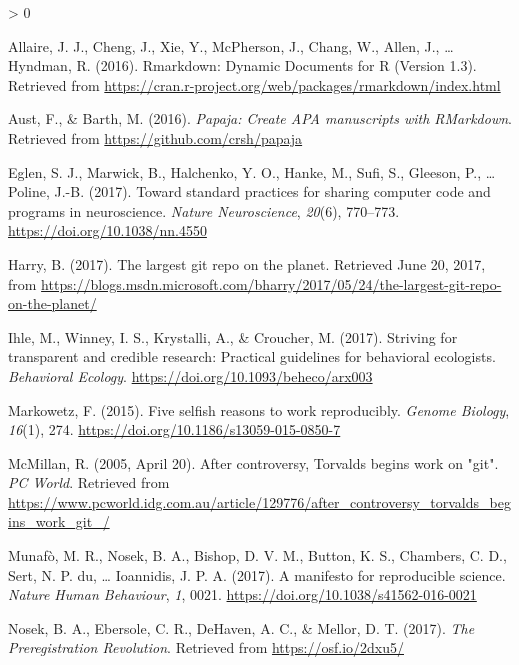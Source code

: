 \documentclass[
  american,
  ,doc,floatsintext]{apa6}
\newlength{\cslhangindent}
\newenvironment{CSLReferences}[2] %
 {%
  \setlength{\parindent}{0pt}
  \ifodd #1 \everypar{\setlength{\hangindent}{\cslhangindent}}\ignorespaces\fi
  \ifnum #2 > 0
  \setlength{\parskip}{#2\baselineskip}
  \fi
 }%
 {}
\begin{document}
\hypertarget{refs}{}
\begin{CSLReferences}{1}{0}
\leavevmode\hypertarget{ref-allaire_rmarkdown:_2016}{}%
Allaire, J. J., Cheng, J., Xie, Y., McPherson, J., Chang, W., Allen, J., \ldots{} Hyndman, R. (2016). Rmarkdown: {Dynamic Documents} for {R} (Version 1.3). Retrieved from \url{https://cran.r-project.org/web/packages/rmarkdown/index.html}

\leavevmode\hypertarget{ref-aust_papaja:_2016}{}%
Aust, F., \& Barth, M. (2016). \emph{Papaja: {Create APA} manuscripts with {RMarkdown}}. Retrieved from \url{https://github.com/crsh/papaja}

\leavevmode\hypertarget{ref-eglen_toward_2017}{}%
Eglen, S. J., Marwick, B., Halchenko, Y. O., Hanke, M., Sufi, S., Gleeson, P., \ldots{} Poline, J.-B. (2017). Toward standard practices for sharing computer code and programs in neuroscience. \emph{Nature Neuroscience}, \emph{20}(6), 770--773. \url{https://doi.org/10.1038/nn.4550}

\leavevmode\hypertarget{ref-harry_largest_2017}{}%
Harry, B. (2017). The largest git repo on the planet. Retrieved June 20, 2017, from \url{https://blogs.msdn.microsoft.com/bharry/2017/05/24/the-largest-git-repo-on-the-planet/}

\leavevmode\hypertarget{ref-ihle_striving_2017}{}%
Ihle, M., Winney, I. S., Krystalli, A., \& Croucher, M. (2017). Striving for transparent and credible research: Practical guidelines for behavioral ecologists. \emph{Behavioral Ecology}. \url{https://doi.org/10.1093/beheco/arx003}

\leavevmode\hypertarget{ref-markowetz_five_2015}{}%
Markowetz, F. (2015). Five selfish reasons to work reproducibly. \emph{Genome Biology}, \emph{16}(1), 274. \url{https://doi.org/10.1186/s13059-015-0850-7}

\leavevmode\hypertarget{ref-mcmillan_after_2005}{}%
McMillan, R. (2005, April 20). After controversy, {Torvalds} begins work on {"}git{"}. \emph{PC World}. Retrieved from \url{https://www.pcworld.idg.com.au/article/129776/after_controversy_torvalds_begins_work_git_/}

\leavevmode\hypertarget{ref-munafo_manifesto_2017}{}%
Munafò, M. R., Nosek, B. A., Bishop, D. V. M., Button, K. S., Chambers, C. D., Sert, N. P. du, \ldots{} Ioannidis, J. P. A. (2017). A manifesto for reproducible science. \emph{Nature Human Behaviour}, \emph{1}, 0021. \url{https://doi.org/10.1038/s41562-016-0021}

\leavevmode\hypertarget{ref-nosek_preregistration_2017}{}%
Nosek, B. A., Ebersole, C. R., DeHaven, A. C., \& Mellor, D. T. (2017). \emph{The {Preregistration Revolution}}. Retrieved from \url{https://osf.io/2dxu5/}


\end{CSLReferences}
\end{document}
